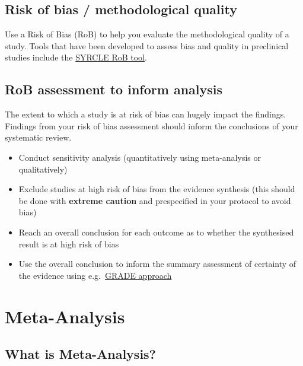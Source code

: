 \documentclass[
]{book}
\providecommand{\tightlist}{%
  \setlength{\itemsep}{0pt}\setlength{\parskip}{0pt}}
\begin{document}
\hypertarget{risk-of-bias-methodological-quality}{%
\section{Risk of bias / methodological quality}\label{risk-of-bias-methodological-quality}}

Use a Risk of Bias (RoB) to help you evaluate the methodological quality of a study. Tools that have been developed to assess bias and quality in preclinical studies include the \href{https://bmcmedresmethodol.biomedcentral.com/track/pdf/10.1186/1471-2288-14-43}{SYRCLE RoB tool}.

\hypertarget{rob-assessment-to-inform-analysis}{%
\section{RoB assessment to inform analysis}\label{rob-assessment-to-inform-analysis}}

The extent to which a study is at risk of bias can hugely impact the findings. Findings from your risk of bias assessment should inform the conclusions of your systematic review.

\begin{itemize}
\tightlist
\item
  Conduct sensitivity analysis (quantitatively using meta-analysis or qualitatively)
\item
  Exclude studies at high risk of bias from the evidence synthesis (this should be done with \textbf{extreme caution} and prespecified in your protocol to avoid bias)
\item
  Reach an overall conclusion for each outcome as to whether the synthesised result is at high risk of bias
\item
  Use the overall conclusion to inform the summary assessment of certainty of the evidence using e.g.~\href{https://bestpractice.bmj.com/info/toolkit/learn-ebm/what-is-grade/}{GRADE approach}
\end{itemize}

\hypertarget{meta-analysis}{%
\chapter{Meta-Analysis}\label{meta-analysis}}

\hypertarget{what-is-meta-analysis}{%
\section{What is Meta-Analysis?}\label{what-is-meta-analysis}}
\end{document}
